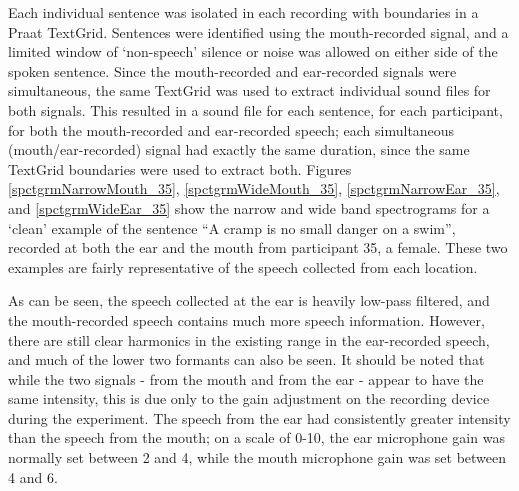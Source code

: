 Each individual sentence was isolated in each recording with boundaries in a Praat TextGrid.  Sentences were identified using the mouth-recorded signal, and a limited window of `non-speech' silence or noise was allowed on either side of the spoken sentence.  Since the mouth-recorded and ear-recorded signals were simultaneous, the same TextGrid was used to extract individual sound files for both signals.  This resulted in a sound file for each sentence, for each participant, for both the mouth-recorded and ear-recorded speech; each simultaneous (mouth/ear-recorded) signal had exactly the same duration, since the same TextGrid boundaries were used to extract both.  Figures \ref{spctgrmNarrowMouth_35}, \ref{spctgrmWideMouth_35}, \ref{spctgrmNarrowEar_35}, and \ref{spctgrmWideEar_35} show the narrow and wide band spectrograms for a `clean' example of the sentence ``A cramp is no small danger on a swim'', recorded at both the ear and the mouth from participant 35, a female.  These two examples are fairly representative of the speech collected from each location.

As can be seen, the speech collected at the ear is heavily low-pass filtered, and the mouth-recorded speech contains much more speech information. However, there are still clear harmonics in the existing range in the ear-recorded speech, and much of the lower two formants can also be seen.  It should be noted that while the two signals - from the mouth and from the ear - appear to have the same intensity, this is due only to the gain adjustment on the recording device during the experiment.  The speech from the ear had consistently greater intensity than the speech from the mouth; on a scale of 0-10, the ear microphone gain was normally set between 2 and 4, while the mouth microphone gain was set between 4 and 6.


